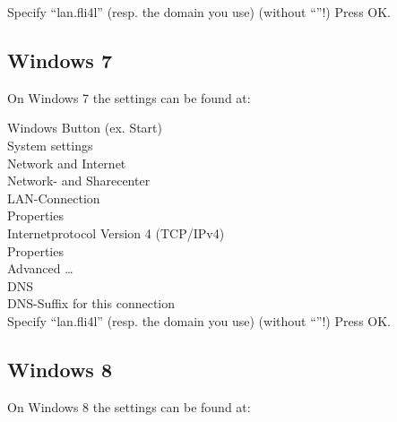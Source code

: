   Specify ``lan.fli4l'' (resp. the domain you use) (without ``''!)
  \pfeil Press OK.

\subsection{Windows 7}

  On Windows 7 the settings can be found at:

  \noindent Windows Button (ex. Start) \pfeil\\
  \hspace*{2ex}System settings \pfeil\\
  \hspace*{4ex}Network and Internet \pfeil\\
  \hspace*{6ex}Network- and Sharecenter \pfeil\\
  \hspace*{8ex}LAN-Connection\pfeil\\
  \hspace*{10ex}Properties \pfeil\\
  \hspace*{12ex}Internetprotocol Version 4 (TCP/IPv4) \pfeil\\
  \hspace*{14ex}Properties \pfeil\\
  \hspace*{16ex}Advanced \ldots \pfeil\\
  \hspace*{18ex}DNS \pfeil\\
  \hspace*{20ex}DNS-Suffix for this connection \pfeil\\

  Specify ``lan.fli4l'' (resp. the domain you use) (without ``''!)
  \pfeil Press OK.

\subsection{Windows 8}

  On Windows 8 the settings can be found at:

